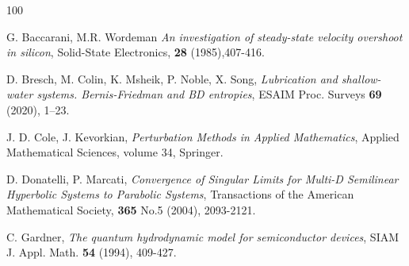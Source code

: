 \documentclass[english]{amsart}
\theoremstyle{plain}
\theoremstyle{definition}
\theoremstyle{remark}
\theoremstyle{plain}
\theoremstyle{plain}
\theoremstyle{plain}
\numberwithin{equation}{section}
\begin{document}
\begin{thebibliography}{100}

 G. Baccarani, M.R. Wordeman \emph{An investigation of steady-state velocity overshoot in silicon}, Solid-State Electronics, {\bf 28} (1985),407-416.






 D. Bresch, M. Colin, K. Msheik, P. Noble, X. Song, \emph{Lubrication and shallow-water systems. Bernis-Friedman and BD entropies}, ESAIM Proc. Surveys {\bf 69} (2020), 1--23.

 J. D. Cole, J. Kevorkian, \emph{Perturbation Methods in Applied Mathematics}, Applied Mathematical Sciences, volume 34, Springer.



 D. Donatelli, P. Marcati, \emph{Convergence of Singular Limits for Multi-D Semilinear Hyperbolic Systems to Parabolic Systems}, Transactions of the American Mathematical Society, {\bf 365} No.5 (2004), 2093-2121.



 C. Gardner, \emph{The quantum hydrodynamic model for semiconductor devices}, SIAM J. Appl. Math. {\bf 54} (1994), 409-427.



\end{thebibliography}
\end{document}
